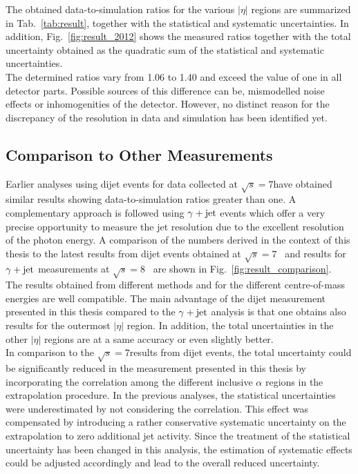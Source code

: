 The obtained data-to-simulation ratios for the various $|\eta|$ regions are summarized in Tab.~\ref{tab:result}, together with the statistical and systematic uncertainties. In addition, Fig.~\ref{fig:result_2012} shows the measured ratios together with the total uncertainty obtained as the quadratic sum of the statistical and systematic uncertainties. 
\\
The determined ratios vary from 1.06 to 1.40 and exceed the value of one in all detector parts. Possible sources of this difference can be, \eg mismodelled noise effects or inhomogenities of the detector. However, no distinct reason for the discrepancy of the resolution in data and simulation has been identified yet. 

 
\subsection{Comparison to Other Measurements}
\label{subsec:jer_results_comparison}
Earlier analyses using dijet events for data collected at $\sqrt{s}=7$\tev have obtained similar results showing data-to-simulation ratios greater than one. A complementary approach is followed using $\gamma +\rm{jet}$ events which offer a very precise opportunity to measure the jet resolution due to the excellent resolution of the photon energy. A comparison of the numbers derived in the context of this thesis to the latest results from dijet events obtained at $\sqrt{s}=7$\tev~\cite{thesis:Schroeder} and results for $\gamma +\rm{jet}$ measurements at $\sqrt{s}=8$\tev~\cite{CMS-AN-2013-179} are shown in Fig.~\ref{fig:result_comparison}.
\\
The results obtained from different methods and for the different centre-of-mass energies are well compatible. The main advantage of the dijet measurement presented in this thesis compared to the $\gamma +\rm{jet}$ analysis is that one obtains also results for the outermost $|\eta|$ region. In addition, the total uncertainties in the other $|\eta|$ regions are at a same accuracy or even slightly better. 
\\
In comparison to the $\sqrt{s}=7$\tev results from dijet events, the total uncertainty could be significantly reduced in the measurement presented in this thesis by incorporating the correlation among the different inclusive $\alpha$ regions in the extrapolation procedure. In the previous analyses, the statistical uncertainties were underestimated by not considering the correlation. This effect was compensated by introducing a rather conservative systematic uncertainty on the extrapolation to zero additional jet activity. Since the treatment of the statistical uncertainty has been changed in this analysis, the estimation of systematic effects could be adjusted accordingly and lead to the overall reduced uncertainty.
